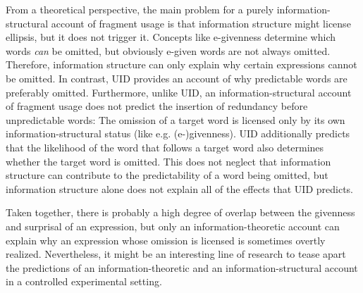 From a theoretical perspective, the main problem for a purely information-structural account of fragment usage is that information structure might license ellipsis, but it does not trigger it. Concepts like e-givenness determine which words \textit{can} be omitted, but obviously e-given words are not always omitted. Therefore, information structure can only explain why certain expressions cannot be omitted. In contrast, UID provides an account of why predictable words are preferably omitted. Furthermore, unlike UID, an information-structural account of fragment usage does not predict the insertion of redundancy before unpredictable words: The omission of a target word is licensed only by its own infor\-ma\-tion-structural status (like e.g. (e-)givenness). UID additionally predicts that the likelihood of the word that follows a target word also determines whether the target word is omitted. This does not neglect that information structure can contribute to the predictability of a word being omitted, but information structure alone does not explain all of the effects that UID predicts.

Taken together, there is probably a high degree of overlap between the givenness and surprisal of an expression, but only an information-theoretic account can explain why an expression whose omission is licensed is sometimes overtly realized. Nevertheless, it might be an interesting line of research to tease apart the predictions of an information-theoretic and an information-structural account in a controlled experimental setting.